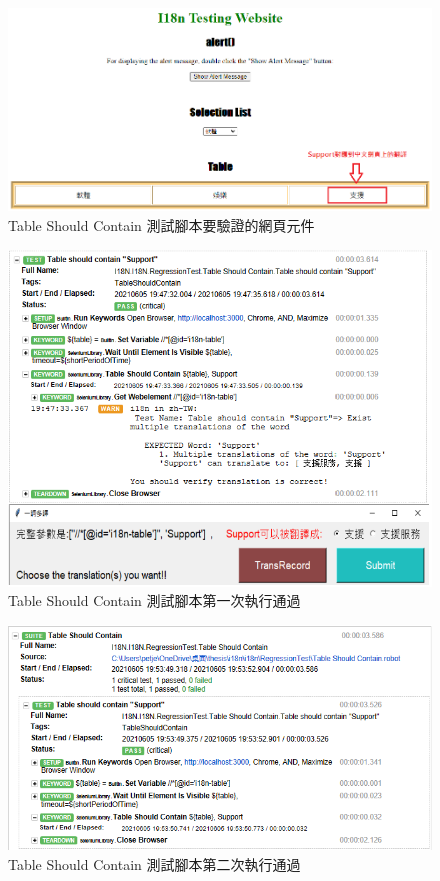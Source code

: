 \begin{figure}[H]
\includegraphics[width= \textwidth]{../論文截圖/4-1-13 Table should contain要驗證的網頁元件.png}
\caption{Table Should Contain 測試腳本要驗證的網頁元件}
\end{figure}

\begin{figure}[H]
\includegraphics[width= \textwidth]{../論文截圖/4.1.6-2 table should contain 1st run.png}
\caption{Table Should Contain 測試腳本第一次執行通過}
\end{figure}

\begin{figure}[H]
\includegraphics[width= \textwidth]{../論文截圖/4.1.6-3 table should contain 2nd run.png}
\caption{Table Should Contain 測試腳本第二次執行通過}
\end{figure}

